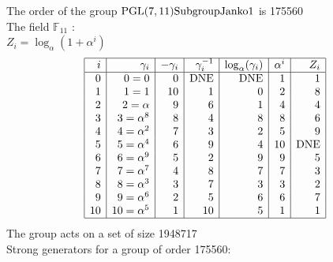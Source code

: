 \noindent The order of the group ${\rm PGL}(7,11){\rm Subgroup Janko1}$ is 175560\\
\noindent The field ${\mathbb F}_{11}$ :\\
\small
$Z_i = \log_\alpha (1 + \alpha^i)$\\
$$\begin{array}{|*{7}{r|}}
\hline
i & \gamma_i & -\gamma_i& \gamma_i^{-1}& \log_\alpha(\gamma_i)& \alpha^i& Z_i\\
\hline
  0 & 0 = 0 &0 & \mbox{DNE} & \mbox{DNE} &1 &1\\
  1 &   1 = 1 &10 &1 &0 &2 &8\\
  2 &   2 = \alpha  &9 &6 &1 &4 &4\\
  3 &   3 = \alpha^{8} &8 &4 &8 &8 &6\\
  4 &   4 = \alpha^{2} &7 &3 &2 &5 &9\\
  5 &   5 = \alpha^{4} &6 &9 &4 &10 & \mbox{DNE}\\
  6 &   6 = \alpha^{9} &5 &2 &9 &9 &5\\
  7 &   7 = \alpha^{7} &4 &8 &7 &7 &3\\
  8 &   8 = \alpha^{3} &3 &7 &3 &3 &2\\
  9 &   9 = \alpha^{6} &2 &5 &6 &6 &7\\
 10 &  10 = \alpha^{5} &1 &10 &5 &1 &1\\
\hline
\end{array}
$$
\noindent The group acts on a set of size 1948717\\
Strong generators for a group of order 175560:
